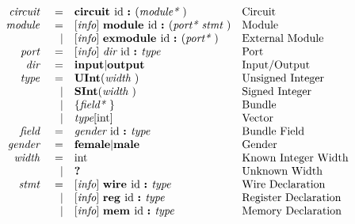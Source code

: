 \documentclass[12pt]{article}
\begin{document}
\[
\begin{array}{rrll}
\text{\em circuit\ }    &=     &\text{\bf circuit\ } \text{id } \text{\bf :\ } (\text{\em module*\ })                                        &\text{Circuit}\\
\text{\em module\ }     &=     &[\text{\em info}]\  \text{\bf module\ }  \text{id } \text{\bf :\ } (\text{\em port*\ } \text{\em stmt\ })                          &\text{Module}\\
                &\vert &[\text{\em info}]\  \text{\bf exmodule\ }  \text{id } \text{\bf :\ } (\text{\em port*\ })                                  &\text{External Module}\\
\text{\em port\ }       &=     &[\text{\em info}]\  \text{\em dir\ } \text{id } \text{\bf :\ } \text{\em type\ }                                           &\text{Port}\\
\text{\em dir\ }        &=     &\text{\bf input} \vert \text{\bf output}                                                &\text{Input/Output}\\
\text{\em type\ }       &=     &\text{\bf UInt}(\text{\em width\ })                                                        &\text{Unsigned Integer}\\
                &\vert &\text{\bf SInt}(\text{\em width\ })                                                        &\text{Signed Integer}\\
                &\vert &\{\text{\em field*\ }\}                                                         &\text{Bundle}\\
                &\vert &\text{\em type}[\text{int}]                                                             &\text{Vector}\\
\text{\em field\ }      &=     &\text{\em gender\ } \text{id } \text{\bf :\ } \text{\em type\ }                                              &\text{Bundle Field}\\
\text{\em gender\ }     &=     &\text{\bf female} \vert \text{\bf male}                                                 &\text{Gender}\\
\text{\em width\ }      &=     &\text{int}                                                                         &\text{Known Integer Width}\\
                &\vert &\text{\bf ?\ }                                                                        &\text{Unknown Width}\\
\text{\em stmt\ }       &=     &[\text{\em info}]\  \text{\bf wire\ } \text{id } \text{\bf :\ } \text{\em type\ }                                          &\text{Wire Declaration}\\
                &\vert &[\text{\em info}]\  \text{\bf reg\ } \text{id } \text{\bf :\ } \text{\em type\ }                                           &\text{Register Declaration}\\
                &\vert &[\text{\em info}]\  \text{\bf mem\ } \text{id } \text{\bf :\ } \text{\em type\ }                                           &\text{Memory Declaration}\\

\end{array}\]
\end{document}

